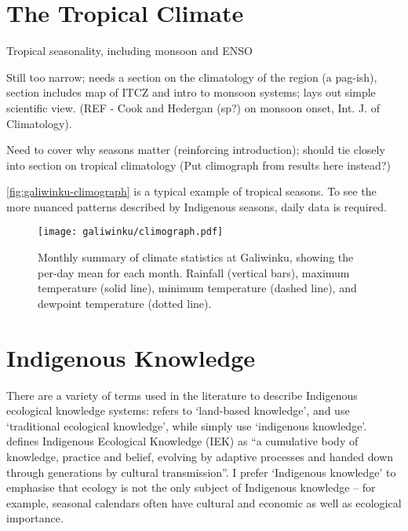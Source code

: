 \section{The Tropical Climate}

Tropical seasonality, including monsoon and ENSO

Still too narrow; needs a section on the climatology of the region (a pag-ish),
section includes map of ITCZ and intro to monsoon systems; lays out simple scientific view.
(REF - Cook and Hedergan (sp?) on monsoon onset, Int. J. of Climatology).

Need to cover why seasons matter (reinforcing introduction); should tie
closely into section on tropical climatology (Put climograph from results here instead?)



\autoref{fig:galiwinku-climograph} is a typical example of tropical seasons.
To see the more nuanced patterns described by Indigenous seasons, daily data is required.

\begin{figure}[h]
    \centering
    \texttt{[image: galiwinku/climograph.pdf]}
    \caption[Monthly Climograph for Galiwinku]{
        Monthly summary of climate statistics at Galiwinku, showing the per-day
        mean for each month.  Rainfall (vertical bars), maximum temperature
        (solid line), minimum temperature (dashed line), and  dewpoint
        temperature (dotted line).}
    \label{fig:galiwinku-climograph}
\end{figure}


\section{Indigenous Knowledge}

There are a variety of terms used in the literature to describe Indigenous 
ecological knowledge systems:  \citet{clarke2009} refers to `land-based knowledge', 
\citet{petheram2010} and \citet{turner2009} use `traditional ecological 
knowledge', while \citet{cochran2015} simply use `indigenous knowledge'.  
\citet{berkes2012} defines Indigenous Ecological Knowledge (IEK) as ``a cumulative 
body of knowledge, practice and belief, evolving by adaptive processes and 
handed down through generations by cultural transmission''.  I prefer 
`Indigenous knowledge' to emphasise that ecology is not the only subject of 
Indigenous knowledge – for example, seasonal calendars often have cultural and 
economic as well as ecological importance.

